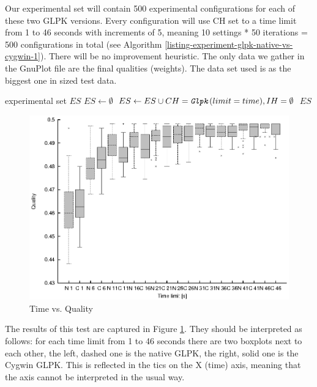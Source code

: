 Our experimental set will contain 500 experimental configurations for each of these two GLPK versions. Every configuration will use  CH set to a time limit from 1 to 46 seconds with increments of 5, meaning 10 settings * 50 iterations = 500 configurations in total (see Algorithm \ref{listing-experiment-glpk-native-vs-cygwin-1}). There will be no improvement heuristic. The only data we gather in the GnuPlot file are the final qualities (weights). The data set used is  as the biggest one in sized test data.\\

\begin{algorithm}
\caption{GLPK: Native vs. Cygwin Set Generation 1}
\label{listing-experiment-glpk-native-vs-cygwin-1}
\begin{algorithmic}
\ENSURE experimental set $ES$
\STATE $ES \gets \emptyset$
    \STATE $ES \gets ES \cup {CH = \texttt{\textit{Glpk}}(limit = time), IH = \emptyset}$
  \ENDFOR
\ENDFOR
\RETURN $ES$
\end{algorithmic}
\end{algorithm}

\begin{figure}
  \caption{Time vs. Quality}
  \label{image-experiment-time-vs-quality}
  \centering
    \includegraphics[width=\textwidth]{images/experiments/time-vs-quality}
\end{figure}

The results of this test are captured in Figure \ref{image-experiment-time-vs-quality}. They should be interpreted as follows: for each time limit from 1 to 46 seconds there are two boxplots next to each other, the left, dashed one is the native GLPK, the right, solid one is the Cygwin GLPK. This is reflected in the tics on the X (time) axis, meaning that the axis cannot be interpreted in the usual way.

